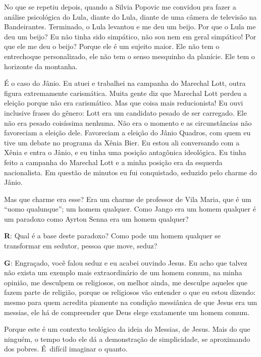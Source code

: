  

No que se repetiu depois, quando a Silvia Popovic me convidou pra fazer
a análise psicológica do Lula, diante do Lula, diante de uma câmera de
televisão na  Bandeirantes. Terminado, o Lula levantou e me deu um
beijo. Por que o Lula me deu um beijo? Eu não tinha sido simpático, não
sou nem em geral simpático! Por que ele me deu o beijo? Porque ele é um
sujeito maior. Ele não tem o entrechoque personalizado, ele não tem o
senso mesquinho da planície. Ele tem o horizonte da montanha.

 

É o caso do Jânio. Eu atuei e trabalhei na campanha do Marechal
Lott, outra figura extremamente carismática. Muita gente diz que
Marechal Lott perdeu a eleição porque não era carismático. Mas que coisa
mais reducionista! Eu ouvi inclusive frases do gênero: Lott era um
candidato pesado de ser carregado. Ele não era pesado coisíssima
nenhuma. Não era o momento e as circunstâncias não favoreciam a eleição
dele. Favoreciam a eleição do Jânio Quadros, com quem eu tive um debate
no programa da Xênia Bier. Eu estou ali conversando com a Xênia e entra
o Jânio, e eu tinha uma posição antagônica ideológica. Eu tinha feito a
campanha do Marechal Lott e a minha posição era da esquerda
nacionalista. Em questão de minutos eu fui conquistado, seduzido pelo
charme do Jânio.

 

Mas que charme era esse? Era um charme de professor de Vila Maria, que é
um ``uomo qualunque''; um homem qualquer. Como Jango era um homem
qualquer é um paradoxo como Ayrton Senna era um homem qualquer?

 

\textbf{R}: Qual é a base deste paradoxo? Como pode um homem qualquer se
transformar em sedutor, pessoa que move, seduz?

 

\textbf{G}: Engraçado, você falou seduz e eu acabei ouvindo Jesus. Eu
acho que talvez não exista um exemplo mais extraordinário de um homem
comum, na minha opinião, me desculpem os religiosos, ou melhor ainda, me
desculpe aqueles que fazem parte de religião, porque os religiosos vão
entender o que eu estou dizendo: mesmo para quem acredita piamente na
condição messiânica de que Jesus era um messias, ele há de compreender
que Deus elege exatamente um homem comum.

Porque este é um contexto teológico da ideia do Messias, de Jesus. Mais
do que ninguém, o tempo todo ele dá a demonstração de simplicidade, se
aproximando dos pobres. É~difícil imaginar o quanto.

